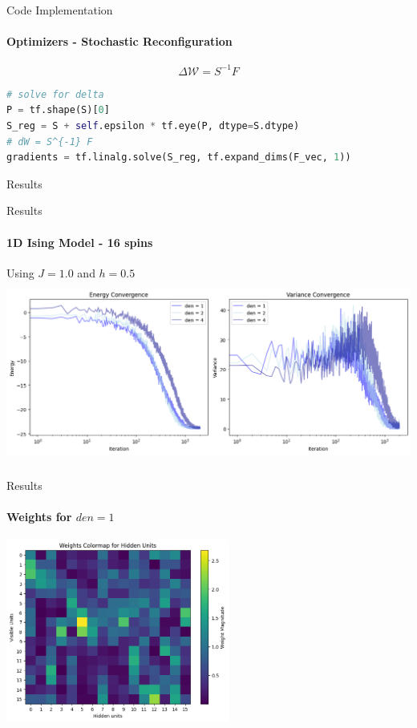 \documentclass{beamer}
\begin{document}
\begin{frame}[fragile]{Code Implementation}
\framesubtitle{Optimizers - Stochastic Reconfiguration}
$$\Delta \mathcal{W} = S^{-1} F$$

\begin{lstlisting}[language=Python, style=kaolstplain]
# solve for delta
P = tf.shape(S)[0]
S_reg = S + self.epsilon * tf.eye(P, dtype=S.dtype)
# dW = S^{-1} F
gradients = tf.linalg.solve(S_reg, tf.expand_dims(F_vec, 1))
\end{lstlisting}
\end{frame}

\begin{chapter}{}{Results}
\end{chapter}

\begin{frame}{Results}
\framesubtitle{1D Ising Model - 16 spins}
Using $J = 1.0$ and $h=0.5$
\includegraphics[height=6cm]{images/16spin_history_j1.png}
\end{frame}

\begin{frame}{Results}
\framesubtitle{Weights for $den = 1$}
\begin{center}
\includegraphics[height=6cm]{images/16spin_den1_j1.png}
\end{center}
\end{frame}
\end{document}
